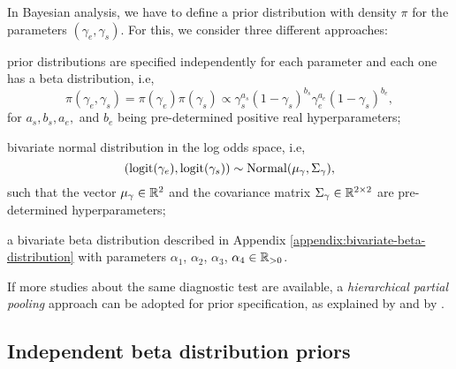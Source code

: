 In Bayesian analysis, we have to define a prior distribution with density $\pi$ for the
parameters $(\gamma_e, \gamma_s)$. For this, we consider three different approaches:

\begin{alineas}
  \item prior distributions are specified independently for each parameter and
  each one has a beta distribution, i.e,
  $$\pi(\gamma_e, \gamma_s) =
    \pi(\gamma_e)\pi(\gamma_s) \propto \gamma_s^{a_s}(1-
    \gamma_s)^{b_s}\gamma_e^{a_e}(1-\gamma_s)^{b_e},$$
  for $a_s, b_s, a_e,$ and $b_e$ being pre-determined positive real hyperparameters;
  \item bivariate normal distribution in the log odds space, i.e,
  $$(\operatorname{logit}(\gamma_e), \operatorname{logit}(\gamma_s)) \sim
    \operatorname{Normal}(\mu_{\gamma}, \Sigma_{\gamma}),$$
  such that the vector $\mu_{\gamma} \in \mathbb{R}^2$ and the covariance matrix
  $\Sigma_{\gamma} \in \mathbb{R}^{2\times 2}$ are pre-determined hyperparameters;
  \item a bivariate beta distribution described in Appendix \ref{appendix:bivariate-beta-distribution}
  with parameters $\alpha_1$, $\alpha_2$, $\alpha_3$, $\alpha_4 \in \mathbb{R}_{>0}$.
\end{alineas}

If more studies about the same diagnostic test are available, a {\em
    hierarchical partial pooling} approach can be adopted for prior specification,
as explained by \textcite[p. 1272-1274]{gelman2020bayesian} and by
\textcite[p. 2-3]{guo2017bayesian}.

\subsection{Independent beta distribution priors}

